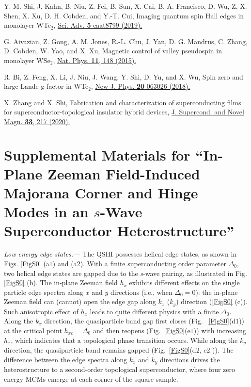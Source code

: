 \documentclass[twocolumn,prl,floatfix,citeautoscript,nofootinbib,superscriptaddress]{revtex4}
\begin{document}
\begin{thebibliography}{99}
 Y. M. Shi, J. Kahn, B. Niu, Z. Fei, B. Sun, X. Cai, B. A.
Francisco, D. Wu, Z.-X. Shen, X. Xu, D. H. Cobden, and Y.-T. Cui, Imaging
quantum spin Hall edges in monolayer \textrm{WTe}$_{2}$, \href{https://doi.org/10.1126/sciadv.aat8799}%
{Sci. Adv. \textbf{5} eaat8799 (2019). }

 G. Aivazian, Z. Gong, A. M. Jones, R.-L. Chu, J. Yan,
D. G. Mandrus, C. Zhang, D. Cobden, W. Yao, and X. Xu, Magnetic control of
valley pseudospin in monolayer WSe$_{2}$, \href{https://doi.org/10.1038/nphys3201}%
{Nat. Phys. \textbf{11}, 148 (2015).}

 R. Bi, Z. Feng, X. Li, J. Niu, J. Wang, Y. Shi, D. Yu, and
X. Wu, Spin zero and large Lande g-factor in \textrm{WTe}$_{2}$, \href{https://doi.org/10.1088/1367-2630/aacbef}%
{New J. Phys. \textbf{20} 063026 (2018). }

 X. Zhang and X. Shi, Fabrication and characterization
of superconducting films for superconductor-topological insulator hybrid
devices, \href{https://doi.org/10.1007/s10948-019-05283-6}{J. Supercond. and
Novel Magn. \textbf{33}, 217 (2020).}
\end{thebibliography}

\newpage \clearpage
\onecolumngrid
\appendix

\section{Supplemental Materials for \textquotedblleft In-Plane Zeeman Field-Induced Majorana Corner and Hinge Modes in an $s$-Wave Superconductor
Heterostructure\textquotedblright}

{\emph{Low energy edge states.--- }}The QSHI possesses helical edge states,
as shown in Figs. \ref{FigS0} (a$1$) and (a$2$). With a finite
superconducting order parameter $\Delta _{0}$, two helical edge states are
gapped due to the \textit{s}-wave pairing, as illustrated in Fig. \ref{FigS0}
(b). The in-plane Zeeman field $h_{x}$ exhibits different effects on the
single particle edge spectra along $x$ and $y$ directions (i.e., when $%
\Delta _{0}=0$): the in-plane Zeeman field can (cannot) open the edge gap
along $k_{x}$ ($k_{y}$) direction (\ref{FigS0} (c)). Such anisotropic effect
of $h_{x}$ leads to quite different physics with a finite $\Delta _{0}$.
Along the $k_{x}$ direction, the quasiparticle band gap first closes (Fig.~%
\ref{FigS0}(d$1$)) at the critical point $h_{xc}=\Delta _{0}$ and then
reopens (Fig.~\ref{FigS0}(e$1$)) with increasing $h_{x}$, which indicates
that a topological phase transition occurs. While along the $k_{y}$
direction, the quasiparticle band remains gapped (Fig.~\ref{FigS0}(d$2$, e$2$%
)).
The difference between the edge spectra along $k_{x}$ and $k_{y}$ directions
drives the heterostructure to a second-order topological superconductor,
where four zero energy MCMs emerge at each corner of the square sample.
\end{document}

